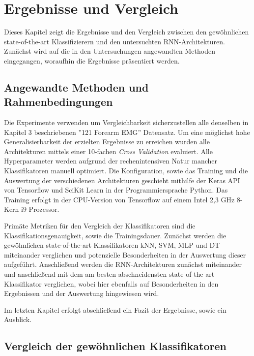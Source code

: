 \chapter{Ergebnisse und Vergleich}
\label{chap:results}

Dieses Kapitel zeigt die Ergebnisse und den Vergleich zwischen den gewöhnlichen state-of-the-art Klassifizierern und den untersuchten RNN-Architekturen. Zunächst wird auf die in den Untersuchungen angewandten Methoden eingegangen, woraufhin die Ergebnisse präsentiert werden.

\section{Angewandte Methoden und Rahmenbedingungen}
\label{section:methods}

Die Experimente verwenden um Vergleichbarkeit sicherzustellen alle denselben in Kapitel 3 beschriebenen ''121 Forearm EMG'' Datensatz. Um eine möglichst hohe Generalisierbarkeit der erzielten Ergebnisse zu erreichen wurden alle Architekturen mittels einer 10-fachen \textit{Cross Validation} evaluiert. Alle Hyperparameter werden aufgrund der rechenintensiven Natur mancher Klassifikatoren manuell optimiert. Die Konfiguration, sowie das Training und die Auswertung der verschiedenen Architekturen geschieht mithilfe der Keras API von Tensorflow und SciKit Learn in der Programmiersprache Python. Das Training erfolgt in der CPU-Version von Tensorflow auf einem Intel 2,3 GHz 8-Kern i9 Prozessor.

Primäte Metriken für den Vergleich der Klassifikatoren sind die Klassifikationsgenauigkeit, sowie die Trainingsdauer. Zunächst werden die gewöhnlichen state-of-the-art Klassifikatoren kNN, SVM, MLP und DT miteinander verglichen und potenzielle Besonderheiten in der Auswertung dieser aufgeführt. Anschließend werden die RNN-Architekturen zunächst miteinander und anschließend mit dem am besten abschneidensten state-of-the-art Klassifikator verglichen, wobei hier ebenfalls auf Besonderheiten in den Ergebnissen und der Auswertung hingewiesen wird.

Im letzten Kapitel erfolgt abschließend ein Fazit der Ergebnisse, sowie ein Ausblick.

\section{Vergleich der gewöhnlichen Klassifikatoren}
\label{sec:other-classifiers-comp}

